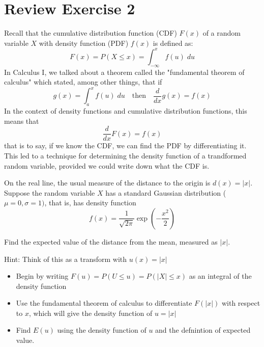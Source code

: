 \documentclass{amsart}
\begin{document}
\section{Review Exercise 2}
Recall that the cumulative distribution function (CDF) $F(x)$ of a random variable $X$ with density function (PDF) $f(x)$ is defined as:
\[
F(x) = P(X\leq x) = \int_{-\infty}^xf(u)\;du
\] 
In Calculus I, we talked about a theorem called the "fundamental theorem of calculus" which stated, among other things, that if
\[
g(x) = \int_a^xf(u)\;du\quad\mbox{then}\quad \frac{d}{dx}g(x) = f(x) 
\]
In the context of density functions and cumulative distribution functions, this means that
\[
\frac{d}{dx}F(x) = f(x)
\]
that is to say, if we know the CDF, we can find the PDF by differentiating it.  This led to a technique for determining the density function of a trandformed random variable, provided we could write down what the CDF is.
\par\vspace{0.5 cm}
On the real line, the usual measure of the distance to the origin is $d(x) = |x|$.  Suppose the random variable $X$ has a standard Gaussian distribution ($\mu=0, \sigma=1)$, that is, has density function
\[
f(x) = \frac{1}{\sqrt{2\pi}}\exp\left(-\frac{x^2}{2}\right)
\]
\par\vspace{0.5 cm}
Find the expected value of the distance from the mean, measured as $|x|$.
\par\vspace{0.5 cm}
Hint:  Think of this as a transform with $u(x) = |x|$
\begin{itemize}
\item Begin by writing $F(u) = P(U \leq u) = P(|X| \leq x)$ as an integral of the density function
\item Use the fundamental theorem of calculus to differentiate $F(|x|)$ with respect to $x$, which will give the density function of $u=|x|$
\item Find $E(u)$ using the density function of $u$ and the defnintion of expected value.
\end{itemize}
\end{document}

